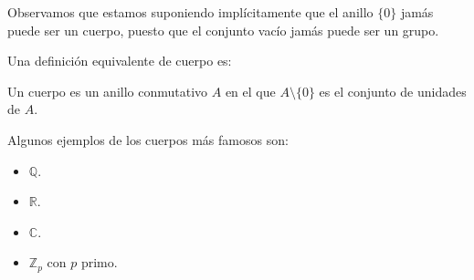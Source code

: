Observamos que estamos suponiendo implícitamente que el anillo $\{0\}$ jamás puede ser un cuerpo, puesto que el conjunto vacío jamás puede ser un grupo.

\begin{observacion}
    Una definición equivalente de cuerpo es:
    \begin{center}
    Un cuerpo es un anillo conmutativo $A$ en el que $A\setminus \{0\}$ es el conjunto de unidades de $A$.
    \end{center}
\end{observacion}

\begin{ejemplo}
    Algunos ejemplos de los cuerpos más famosos son:
    \begin{itemize}
        \item $\mathbb{Q}$.
        \item $\mathbb{R}$.
        \item $\mathbb{C}$.
        \item $\mathbb{Z}_p$ con $p$ primo.
    \end{itemize}
\end{ejemplo}

